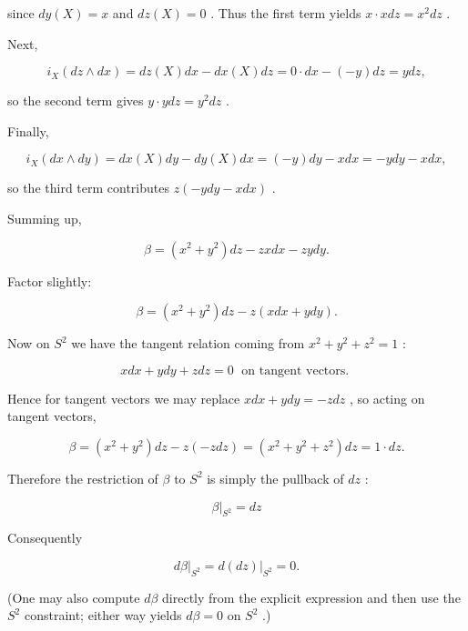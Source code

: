 \documentclass[10pt]{article}
\begin{document}
since \({dy}\left( X\right)  = x\) and \({dz}\left( X\right)  = 0\) . Thus the first term yields \(x \cdot  {xdz} = {x}^{2}{dz}\) .

Next,

\[
{i}_{X}\left( {{dz} \land  {dx}}\right)  = {dz}\left( X\right) {dx} - {dx}\left( X\right) {dz} = 0 \cdot  {dx} - \left( {-y}\right) {dz} = {ydz},
\]

so the second term gives \(y \cdot  {ydz} = {y}^{2}{dz}\) .

Finally,

\[
{i}_{X}\left( {{dx} \land  {dy}}\right)  = {dx}\left( X\right) {dy} - {dy}\left( X\right) {dx} = \left( {-y}\right) {dy} - {xdx} =  - {ydy} - {xdx},
\]

so the third term contributes \(z\left( {-{ydy} - {xdx}}\right)\) .

Summing up,

\[
\beta  = \left( {{x}^{2} + {y}^{2}}\right) {dz} - {zxdx} - {zydy}.
\]

Factor slightly:

\[
\beta  = \left( {{x}^{2} + {y}^{2}}\right) {dz} - z\left( {{xdx} + {ydy}}\right) .
\]

Now on \({S}^{2}\) we have the tangent relation coming from \({x}^{2} + {y}^{2} + {z}^{2} = 1\) :

\[
{xdx} + {ydy} + {zdz} = 0\;\text{ on tangent vectors. }
\]

Hence for tangent vectors we may replace \({xdx} + {ydy} =  - {zdz}\) , so acting on tangent vectors,

\[
\beta  = \left( {{x}^{2} + {y}^{2}}\right) {dz} - z\left( {-{zdz}}\right)  = \left( {{x}^{2} + {y}^{2} + {z}^{2}}\right) {dz} = 1 \cdot  {dz}.
\]

Therefore the restriction of \(\beta\) to \({S}^{2}\) is simply the pullback of \({dz}\) :

\[
{\left. \beta \right| }_{{S}^{2}} = {dz}
\]

Consequently

\[
{\left. d\beta \right| }_{{S}^{2}} = {\left. d\left( dz\right) \right| }_{{S}^{2}} = 0.
\]

(One may also compute \({d\beta }\) directly from the explicit expression and then use the \({S}^{2}\) constraint; either way yields \({d\beta } = 0\) on \({S}^{2}\) .)
\end{document}
